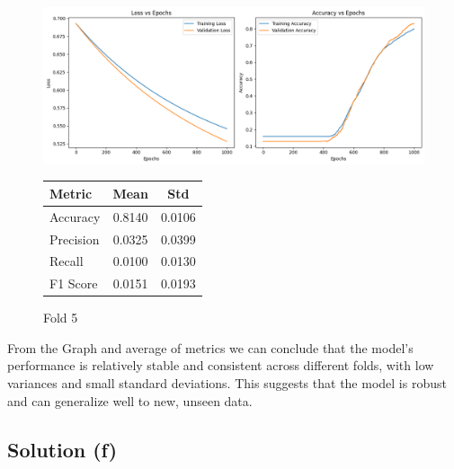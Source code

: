 \documentclass{article}
\begin{document}
\begin{figure}[H]
    \centering
    \begin{minipage}[c]{0.45\linewidth}
        \includegraphics[width=\linewidth]{assets/e-f5.png}
        \caption{Fold 5}
        \label{fig:a}
    \end{minipage}
    \begin{minipage}[c]{0.45\linewidth}
        \centering
        \vspace{0.5cm}
        \begin{tabular}{|l|c|c|}
            \hline
            Metric & Mean & Std \\ \hline
            Accuracy & 0.8140 & 0.0106 \\ \hline
            Precision & 0.0325 & 0.0399 \\ \hline
            Recall & 0.0100 & 0.0130 \\ \hline
            F1 Score & 0.0151 & 0.0193 \\ \hline
        \end{tabular}
    \end{minipage}
\end{figure}

\hspace{-3pt}
From the Graph and average of metrics we can conclude that the model's performance is relatively stable and consistent across different folds, with low variances and small standard deviations. This suggests that the model is robust and can generalize well to new, unseen data.


\vspace{10pt}
\subsection*{Solution (f)}
\end{document}

